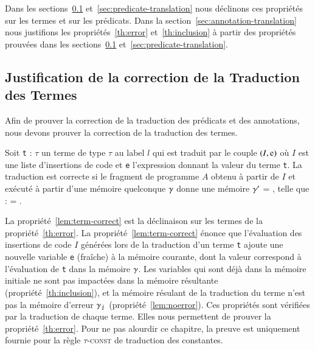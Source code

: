 Dans les sections~\ref{sec:term-translation} et~\ref{sec:predicate-translation}
nous déclinons ces propriétés sur les termes et sur les prédicats.
Dans la section~\ref{sec:annotation-translation} nous justifions les
propriétés~\ref{th:error} et~\ref{th:inclusion} à partir des propriétés prouvées
dans les sections~\ref{sec:term-translation} et~\ref{sec:predicate-translation}.


\subsection{Justification de la correction de la Traduction des Termes}
\label{sec:term-translation}

Afin de prouver la correction de la traduction des prédicats et des annotations,
nous devons prouver la correction de la traduction des termes.

\begin{myproperty}
  \label{lem:term-correct}
  Soit \lstinline't' : $\tau$ un terme de type $\tau$ au label $l$ qui est
  traduit par le couple $(I, \mbox{\lstinline'e'})$ où $I$ est une liste
  d'insertions de code et \lstinline'e' l'expression donnant la valeur du terme
  \lstinline't'.
  La traduction est correcte si le fragment de programme $A$ obtenu à partir de
  $I$ et exécuté à partir d'une mémoire quelconque $\gamma$ donne une
  mémoire $\gamma'$ = , telle que :
   = .
\end{myproperty}

La propriété~\ref{lem:term-correct} est la déclinaison sur les termes de la
propriété~\ref{th:error}.
La propriété~\ref{lem:term-correct} énonce que l'évaluation des insertions de
code $I$ générées lors de la traduction d'un terme \lstinline't' ajoute une
nouvelle variable \lstinline'e' (fraîche) à la mémoire courante, dont la valeur
correspond à l'évaluation de \lstinline't' dans la mémoire $\gamma$.
Les variables qui sont déjà dans la mémoire initiale ne sont pas
impactées dans la mémoire résultante (propriété~\ref{th:inclusion}), et
la mémoire résulant de la traduction du terme n'est pas la mémoire d'erreur
$\gamma_\lightning$ (propriété~\ref{lem:noerror}).
Ces propriétés sont vérifiées par la traduction de chaque terme.
Elles nous permettent de prouver la propriété~\ref{th:error}.
Pour ne pas alourdir ce chapitre, la preuve est uniquement fournie pour la règle
\textsc{$\tau$-const} de traduction des constantes.



